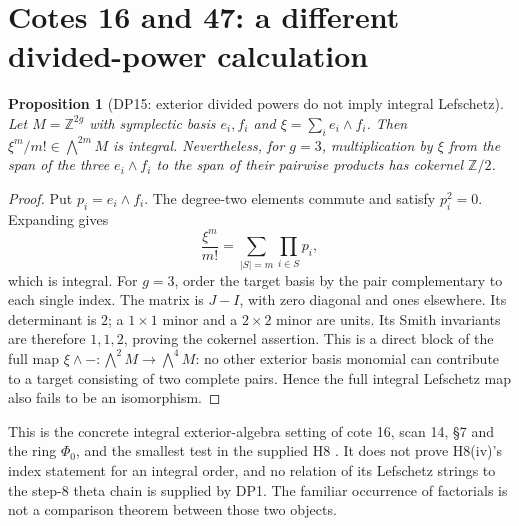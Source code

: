 \documentclass[11pt,a4paper]{article}
\newtheorem{proposition}[theorem]{Proposition}
\theoremstyle{definition}\newtheorem{remark}[theorem]{Remark}
\newcommand{\Z}{\mathbb Z}\newcommand{\Q}{\mathbb Q}\newcommand{\F}{\mathbb F}
\begin{document}
\section{Cotes 16 and 47: a different divided-power calculation}

\begin{proposition}[DP15: exterior divided powers do not imply integral Lefschetz]\label{DP15}
Let $M=\Z^{2g}$ with symplectic basis $e_i,f_i$ and $\xi=\sum_i e_i\wedge f_i$. Then $\xi^m/m!\in\bigwedge^{2m}M$ is integral. Nevertheless, for $g=3$, multiplication by $\xi$ from the span of the three $e_i\wedge f_i$ to the span of their pairwise products has cokernel $\Z/2$.
\end{proposition}
\begin{proof}
Put $p_i=e_i\wedge f_i$. The degree-two elements commute and satisfy $p_i^2=0$. Expanding gives
\[
 \frac{\xi^m}{m!}=\sum_{|S|=m}\prod_{i\in S}p_i,
\]
which is integral. For $g=3$, order the target basis by the pair complementary to each single index. The matrix is $J-I$, with zero diagonal and ones elsewhere. Its determinant is $2$; a $1\times1$ minor and a $2\times2$ minor are units. Its Smith invariants are therefore $1,1,2$, proving the cokernel assertion. This is a direct block of the full map $\xi\wedge-:\bigwedge^2M\to\bigwedge^4M$: no other exterior basis monomial can contribute to a target consisting of two complete pairs. Hence the full integral Lefschetz map also fails to be an isomorphism.
\end{proof}

This is the concrete integral exterior-algebra setting of cote 16, scan 14, \S7 and the ring $\Phi_0$, and the smallest test in the supplied H8 \cite{Hunches}. It does not prove H8(iv)'s index statement for an integral order, and no relation of its Lefschetz strings to the step-8 theta chain is supplied by DP1. The familiar occurrence of factorials is not a comparison theorem between those two objects.
\end{document}
